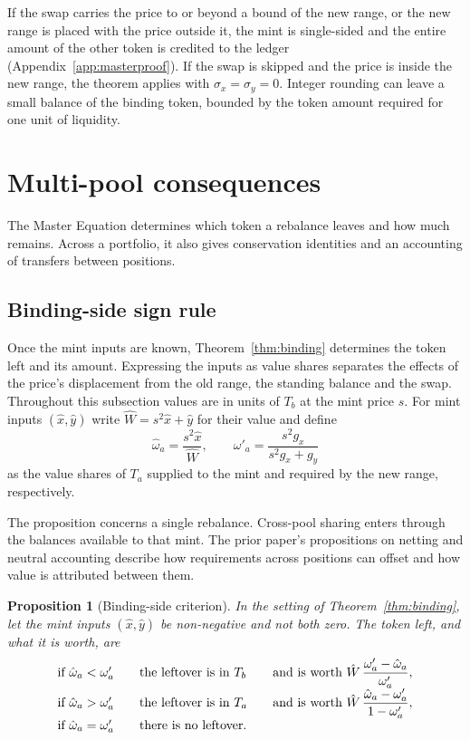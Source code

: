 \documentclass[11pt,a4paper]{article}
\theoremstyle{siphon}
\newtheorem{proposition}{Proposition}
\begin{document}
If the swap carries the price to or beyond a bound of the new range, or the new range is placed with the price outside it, the mint is single-sided and the entire amount of the other token is credited to the ledger (Appendix~\ref{app:masterproof}). If the swap is skipped and the price is inside the new range, the theorem applies with $\sigma_x = \sigma_y = 0$. Integer rounding can leave a small balance of the binding token, bounded by the token amount required for one unit of liquidity.

\section{Multi-pool consequences}\label{sec:multipool}

The Master Equation determines which token a rebalance leaves and how much remains. Across a portfolio, it also gives conservation identities and an accounting of transfers between positions.

\subsection{Binding-side sign rule}\label{sec:connectorrule}

Once the mint inputs are known, Theorem~\ref{thm:binding} determines the token left and its amount. Expressing the inputs as value shares separates the effects of the price's displacement from the old range, the standing balance and the swap. Throughout this subsection values are in units of $T_b$ at the mint price $s$. For mint inputs $(\hat x, \hat y)$ write $\hat W = s^2\hat x + \hat y$ for their value and define
\[
\hat\omega_a = \frac{s^2\hat x}{\hat W}, \qquad \omega'_a = \frac{s^2 g_x}{s^2 g_x + g_y}
\]
as the value shares of $T_a$ supplied to the mint and required by the new range, respectively.

The proposition concerns a single rebalance. Cross-pool sharing enters through the balances available to that mint. The prior paper's propositions on netting and neutral accounting describe how requirements across positions can offset and how value is attributed between them.

\begin{proposition}[Binding-side criterion]\label{thm:connector}
In the setting of Theorem~\ref{thm:binding}, let the mint inputs $(\hat x, \hat y)$ be non-negative and not both zero. The token left, and what it is worth, are
\[
\begin{array}{@{}l@{\qquad}l@{\qquad}l@{}}
\text{if } \hat\omega_a < \omega'_a & \text{the leftover is in } T_b & \text{and is worth } \hat W\,\dfrac{\omega'_a - \hat\omega_a}{\omega'_a}, \\[6pt]
\text{if } \hat\omega_a > \omega'_a & \text{the leftover is in } T_a & \text{and is worth } \hat W\,\dfrac{\hat\omega_a - \omega'_a}{1 - \omega'_a}, \\[6pt]
\text{if } \hat\omega_a = \omega'_a & \text{there is no leftover.} &
\end{array}
\]
\end{proposition}
\end{document}
